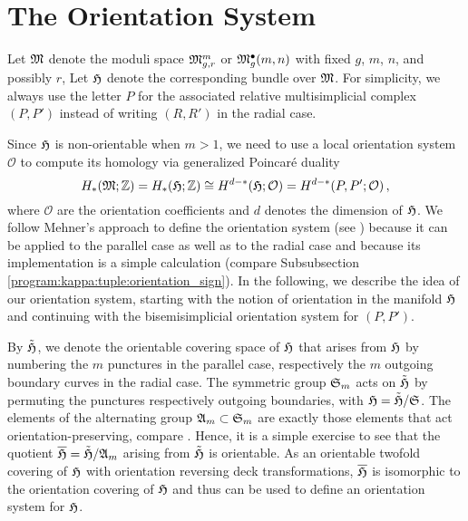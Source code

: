 \section{The Orientation System}
\label{cellular_models:orientation}

Let $\M$ denote the moduli space $\Modspc[r]$ or $\ModspcRad$ with fixed $g$, $m$, $n$, and possibly $r$,
Let $\Har$ denote the corresponding bundle over $\M$.
For simplicity, we always use the letter $P$ for the associated relative multisimplicial complex $(P, P')$
instead of writing $(R, R')$ in the radial case.

Since $\Har$ is non-orientable when $m > 1$, 
we need to use a local orientation system $\mathcal O$ to compute its homology via generalized Poincaré duality
\[
   H_\ast( \M; \Z ) = H_\ast( \Har; \Z ) \cong H^{d-\ast}( \Har; \mathcal O ) = H^{d-\ast}( P, P'; \mathcal O)\,,
\]
where $\mathcal O$ are the orientation coefficients and $d$ denotes the dimension of $\Har$.
We follow Mehner's approach to define the orientation system (see \cite[Chapter 3.7]{Mehner201112}) because
it can be applied to the parallel case as well as to the radial case
and because its implementation is a simple calculation (compare Subsubsection \ref{program:kappa:tuple:orientation_sign}).
In the following, we describe the idea of our orientation system, starting with the notion of orientation in the manifold $\Har$
and continuing with the bisemisimplicial orientation system for $(P, P')$.

By $\tilde \Har$, we denote the orientable covering space of $\Har$ that arises from $\Har$ by numbering the $m$ punctures in the parallel case,
respectively the $m$ outgoing boundary curves in the radial case.
The symmetric group $\SymGr_m$ acts on $\tilde \Har$ by permuting the punctures respectively outgoing boundaries, 
with $\Har = \tilde \Har / \SymGr$.
The elements of the alternating group $\mathfrak A_m \subset \SymGr_m$ are exactly those elements that act orientation-preserving, compare \cite[Chapter 3.4]{Mehner201112}.
Hence, it is a simple exercise to see that the quotient $\overline \Har = \tilde \Har / \mathfrak A_m$ arising from $\tilde \Har$ is orientable.
As an orientable twofold covering of $\Har$ with orientation reversing deck transformations, 
$\overline \Har$ is isomorphic to the orientation covering of $\Har$ and thus can be used to define an orientation system for $\Har$.

